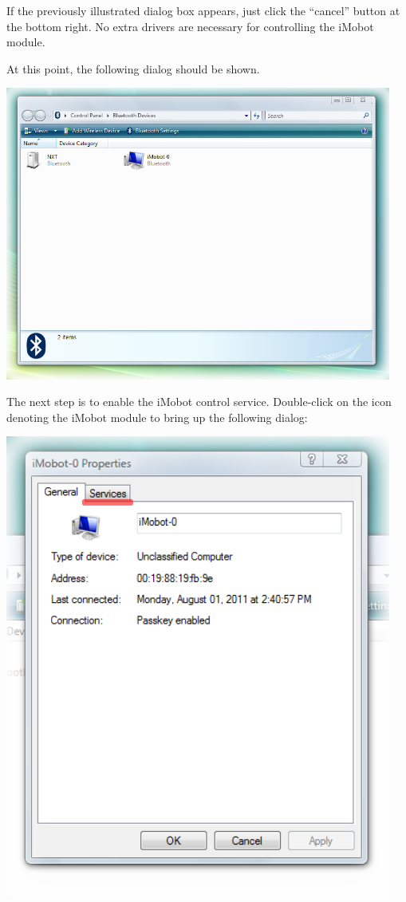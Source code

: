 \documentclass{article}
\begin{document}
If the previously illustrated dialog box appears, just click the ``cancel''
button at the bottom right. No extra drivers are necessary for controlling the
iMobot module.

At this point, the following dialog should be shown.

\begin{center}
\includegraphics[width=5in]{images/imobot_connect_6.png}
\end{center}

The next step is to enable the iMobot control service. 
Double-click on the icon denoting the
iMobot module to bring up the following dialog:

\begin{center}
\includegraphics[width=5in]{images/imobot_connect_7.png}
\end{center}
\end{document}
